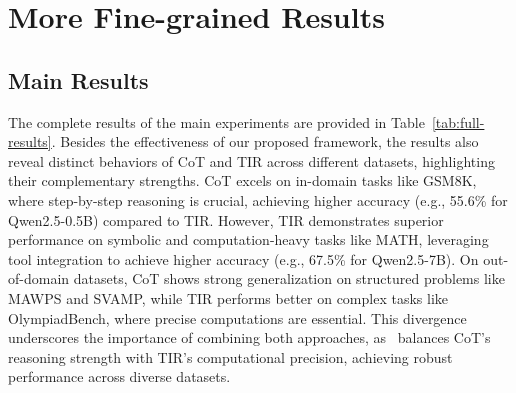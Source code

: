 \section{More Fine-grained Results}\label{app:results}

\subsection{Main Results}\label{app:main_results}

The complete results of the main experiments are provided in Table~\ref{tab:full-results}. Besides the effectiveness of our proposed framework, the results also reveal distinct behaviors of CoT and TIR across different datasets, highlighting their complementary strengths. CoT excels on in-domain tasks like GSM8K, where step-by-step reasoning is crucial, achieving higher accuracy (e.g., 55.6\% for Qwen2.5-0.5B) compared to TIR. However, TIR demonstrates superior performance on symbolic and computation-heavy tasks like MATH, leveraging tool integration to achieve higher accuracy (e.g., 67.5\% for Qwen2.5-7B). On out-of-domain datasets, CoT shows strong generalization on structured problems like MAWPS and SVAMP, while TIR performs better on complex tasks like OlympiadBench, where precise computations are essential. This divergence underscores the importance of combining both approaches, as \method~balances CoT's reasoning strength with TIR's computational precision, achieving robust performance across diverse datasets.

